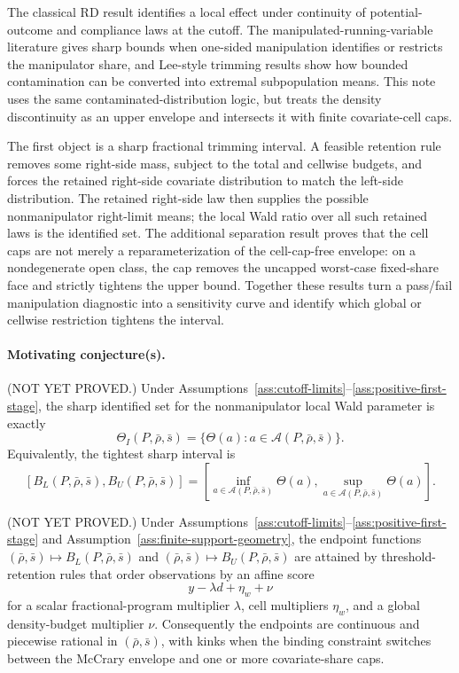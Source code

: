 \documentclass[11pt]{article}
\theoremstyle{definition}
\theoremstyle{plain}
\theoremstyle{remark}
\begin{document}
The classical RD result identifies a local effect under continuity of potential-outcome and
compliance laws at the cutoff.  The manipulated-running-variable literature gives sharp
bounds when one-sided manipulation identifies or restricts the manipulator share, and
Lee-style trimming results show how bounded contamination can be converted into extremal
subpopulation means.  This note uses the same contaminated-distribution logic, but treats
the density discontinuity as an upper envelope and intersects it with finite
covariate-cell caps.

The first object is a sharp fractional trimming interval.  A feasible retention rule
removes some right-side mass, subject to the total and cellwise budgets, and forces the
retained right-side covariate distribution to match the left-side distribution.  The
retained right-side law then supplies the possible nonmanipulator right-limit means; the
local Wald ratio over all such retained laws is the identified set.  The additional
separation result proves that the cell caps are not merely a reparameterization of the
cell-cap-free envelope: on a nondegenerate open class, the cap removes the uncapped
worst-case fixed-share face and strictly tightens the upper bound.  Together these results
turn a pass/fail manipulation diagnostic into a sensitivity curve and identify which global
or cellwise restriction tightens the interval.

\paragraph{Motivating conjecture(s).}
\begin{conjecture}\label{conj:sharp-budgeted-trim}
(NOT YET PROVED.)  Under Assumptions~\ref{ass:cutoff-limits}--\ref{ass:positive-first-stage},
the sharp identified set for the nonmanipulator local Wald parameter is exactly
\[
  \Theta_I(P,\bar\rho,\bar s)
  =
  \{\Theta(a):a\in\mathcal A(P,\bar\rho,\bar s)\}.
\]
Equivalently, the tightest sharp interval is
\[
  [B_L(P,\bar\rho,\bar s),B_U(P,\bar\rho,\bar s)]
  =
  \left[
  \inf_{a\in\mathcal A(P,\bar\rho,\bar s)}\Theta(a),
  \sup_{a\in\mathcal A(P,\bar\rho,\bar s)}\Theta(a)
  \right].
\]
\end{conjecture}

\begin{conjecture}\label{conj:endpoint-geometry}
(NOT YET PROVED.)  Under Assumptions~\ref{ass:cutoff-limits}--\ref{ass:positive-first-stage}
and Assumption~\ref{ass:finite-support-geometry}, the endpoint functions
\((\bar\rho,\bar s)\mapsto B_L(P,\bar\rho,\bar s)\) and
\((\bar\rho,\bar s)\mapsto B_U(P,\bar\rho,\bar s)\) are attained by threshold-retention
rules that order observations by an affine score
\[
  y-\lambda d+\eta_w+\nu
\]
for a scalar fractional-program multiplier \(\lambda\), cell multipliers \(\eta_w\), and
a global density-budget multiplier \(\nu\).  Consequently the endpoints are continuous
and piecewise rational in \((\bar\rho,\bar s)\), with kinks when the binding constraint
switches between the McCrary envelope and one or more covariate-share caps.
\end{conjecture}
\end{document}
